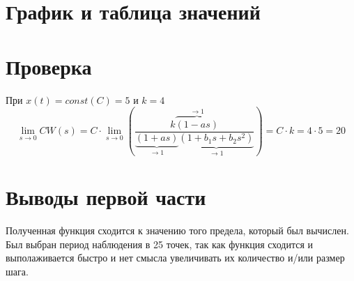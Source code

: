     \section{График и таблица значений}
        \begin{center}
        \end{center}

    \section{Проверка}
        При $x(t) = const (C) = 5$ и $k = 4$
        $$
            \lim_{s\to0}CW(s) = C \cdot \lim_{s\to0}\left(\dfrac{k\overbrace{(1-as)}^{\to1}}{\underbrace{(1+as)}_{\to1}\underbrace{(1+b_1s+b_2s^2)}_{\to1}}\right) = C \cdot k = 4 \cdot 5 = 20
        $$

    \section{Выводы первой части}
        Полученная функция сходится к значению того предела, который был вычислен. Был выбран период наблюдения в 25 точек, так как функция сходится и выполаживается быстро и нет смысла увеличивать их количество и/или размер шага.
